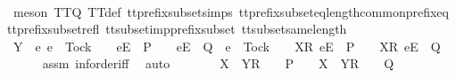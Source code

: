 \begin{isabellebody}
\ \ \ \ \ \ \isamarkupfalse%
\ {\isacharparenleft}meson\ TT{}{\isacharunderscore}Q\ TT{}{\isacharunderscore}def\ tt{\isacharunderscore}prefix{\isacharunderscore}subset{\isachardot}simps{\isacharparenleft}{}{\isacharparenright}\ tt{\isacharunderscore}prefix{\isacharunderscore}subset{\isacharunderscore}eq{\isacharunderscore}length{\isacharunderscore}common{\isacharunderscore}prefix{\isacharunderscore}eq\ tt{\isacharunderscore}prefix{\isacharunderscore}subset{\isacharunderscore}refl\ tt{\isacharunderscore}subset{\isacharunderscore}imp{\isacharunderscore}prefix{\isacharunderscore}subset\ tt{\isacharunderscore}subset{\isacharunderscore}same{\isacharunderscore}length{\isacharparenright}\isanewline
\ \ \isamarkupfalse%
\isanewline
\ \ \isamarkupfalse%
\ \isamarkupfalse%
\ {\isachardoublequoteopen}Y\ {\isasyminter}\ {\isacharbraceleft}e{\isachardot}\ e\ {\isasymnoteq}\ Tock\ {\isasymand}\ {\isasymrho}{\isacharprime}{\isacharprime}\ {\isacharat}\ {\isacharbrackleft}{\isacharbrackleft}e{\isacharbrackright}\isactrlsub E{\isacharbrackright}\ {\isasymin}\ P\ {\isasymand}\ {\isasymrho}{\isacharprime}{\isacharprime}\ {\isacharat}\ {\isacharbrackleft}{\isacharbrackleft}e{\isacharbrackright}\isactrlsub E{\isacharbrackright}\ {\isasymin}\ Q\ {\isasymor}\ e\ {\isacharequal}\ Tock\ {\isasymand}\ {\isasymrho}{\isacharprime}{\isacharprime}\ {\isacharat}\ {\isacharbrackleft}{\isacharbrackleft}X{\isacharprime}{\isacharbrackright}\isactrlsub R{\isacharcomma}\ {\isacharbrackleft}e{\isacharbrackright}\isactrlsub E{\isacharbrackright}\ {\isasymin}\ P\ {\isasymand}\ {\isasymrho}{\isacharprime}{\isacharprime}\ {\isacharat}\ {\isacharbrackleft}{\isacharbrackleft}X{\isacharprime}{\isacharbrackright}\isactrlsub R{\isacharcomma}\ {\isacharbrackleft}e{\isacharbrackright}\isactrlsub E{\isacharbrackright}\ {\isasymin}\ Q{\isacharbraceright}\ {\isacharequal}\ {\isacharbraceleft}{\isacharbraceright}{\isachardoublequoteclose}\isanewline
\ \ \ \ \isamarkupfalse%
\ assm{}\ inf{\isachardot}order{\isacharunderscore}iff\ \isamarkupfalse%
\ auto\isanewline
\ \ \isamarkupfalse%
\ \isamarkupfalse%
\ {\isachardoublequoteopen}{\isasymrho}{\isacharprime}{\isacharprime}\ {\isacharat}\ {\isacharbrackleft}X{\isacharprime}\ {\isasymunion}\ Y{\isacharbrackright}\isactrlsub R\ {\isacharhash}\ {\isasymsigma}{\isacharprime}{\isacharprime}\ {\isasymin}\ P\ {\isasymand}\ {\isasymrho}{\isacharprime}{\isacharprime}\ {\isacharat}\ {\isacharbrackleft}X{\isacharprime}\ {\isasymunion}\ Y{\isacharbrackright}\isactrlsub R\ {\isacharhash}\ {\isasymsigma}{\isacharprime}{\isacharprime}\ {\isasymin}\ Q{\isachardoublequoteclose}\isanewline

\end{isabellebody}
